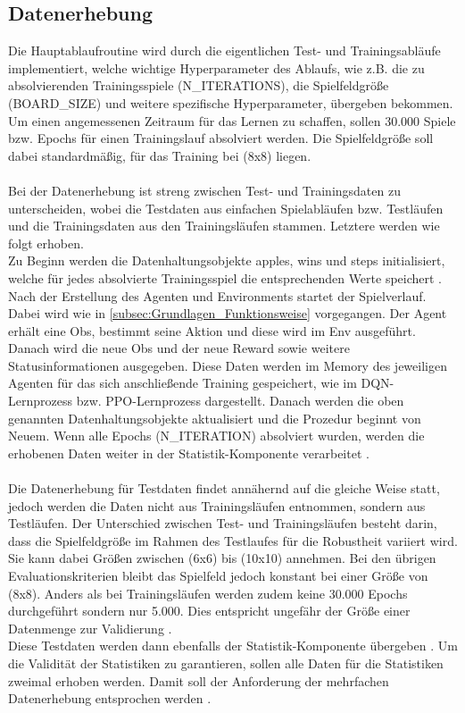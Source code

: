 \subsection{Datenerhebung} \label{subsec:Konzept_Datenerhebung}
Die Hauptablaufroutine wird durch die eigentlichen Test- und Trainingsabläufe implementiert, welche
wichtige Hyperparameter des Ablaufs, wie z.B. die zu absolvierenden Trainingsspiele (N\_ITERATIONS), die Spielfeldgröße (BOARD\_SIZE) und weitere spezifische Hyperparameter, übergeben bekommen. Um einen angemessenen Zeitraum für das Lernen zu schaffen, sollen 30.000 Spiele bzw. Epochs für einen Trainingslauf absolviert werden. Die Spielfeldgröße soll dabei standardmäßig, für das Training bei (8x8) liegen.\\
\\Bei der Datenerhebung ist streng zwischen Test- und Trainingsdaten zu unterscheiden, wobei die Testdaten aus einfachen Spielabläufen bzw. Testläufen und die Trainingsdaten aus den Trainingsläufen stammen. Letztere werden wie folgt erhoben.\\
Zu Beginn werden die Datenhaltungsobjekte apples, wins und steps initialisiert, welche für jedes absolvierte Trainingsspiel die entsprechenden Werte speichert . 
Nach der Erstellung des Agenten und Environments startet der Spielverlauf.\\
Dabei wird wie in \autoref{subsec:Grundlagen_Funktionsweise} vorgegangen. Der Agent erhält eine Obs, bestimmt seine Aktion und diese wird im Env ausgeführt. Danach wird die neue Obs und der neue Reward sowie weitere Statusinformationen ausgegeben. Diese Daten werden im Memory des jeweiligen Agenten für das sich anschließende Training gespeichert, wie im DQN-Lernprozess  bzw. PPO-Lernprozess  dargestellt. 
Danach werden die oben genannten Datenhaltungsobjekte aktualisiert und die Prozedur beginnt von Neuem. Wenn alle Epochs (N\_ITERATION) absolviert wurden, werden die erhobenen Daten weiter in der Statistik-Komponente verarbeitet .\\
\\Die Datenerhebung für Testdaten findet annähernd auf die gleiche Weise statt, jedoch werden die Daten nicht aus Trainingsläufen entnommen, sondern aus Testläufen. Der Unterschied zwischen Test- und Trainingsläufen besteht darin, dass die Spielfeldgröße im Rahmen des Testlaufes für die Robustheit variiert wird. Sie kann dabei Größen zwischen (6x6) bis (10x10) annehmen. Bei den übrigen Evaluationskriterien bleibt das Spielfeld jedoch konstant bei einer Größe von (8x8). Anders als bei Trainingsläufen werden zudem keine 30.000 Epochs durchgeführt sondern nur 5.000. Dies entspricht ungefähr der Größe einer Datenmenge zur Validierung \cite[S. 134]{DL}.\\
Diese Testdaten werden dann ebenfalls der Statistik-Komponente übergeben .
Um die Validität der Statistiken zu garantieren, sollen alle Daten für die Statistiken zweimal erhoben werden. Damit soll der Anforderung der mehrfachen Datenerhebung entsprochen werden . 

